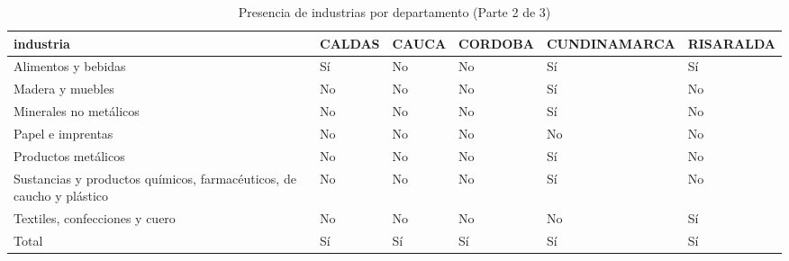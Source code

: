 \documentclass[12pt]{article}
\begin{document}
\setcounter{table}{2}
\begin{table}[htbp]
\centering
\large

\caption{Presencia de industrias por departamento (Parte 2 de 3)}
\begin{tabular}[t]{llllll}
\toprule
industria & CALDAS & CAUCA & CORDOBA & CUNDINAMARCA & RISARALDA\\
\midrule
Alimentos y bebidas & Sí & No & No & Sí & Sí\\
Madera y muebles & No & No & No & Sí & No\\
Minerales no metálicos & No & No & No & Sí & No\\
Papel e imprentas & No & No & No & No & No\\
Productos metálicos & No & No & No & Sí & No\\
\addlinespace
Sustancias y productos químicos, farmacéuticos, de caucho y plástico & No & No & No & Sí & No\\
Textiles, confecciones y cuero & No & No & No & No & Sí\\
Total & Sí & Sí & Sí & Sí & Sí\\
\bottomrule
\end{tabular}
\end{table}
\end{document}
